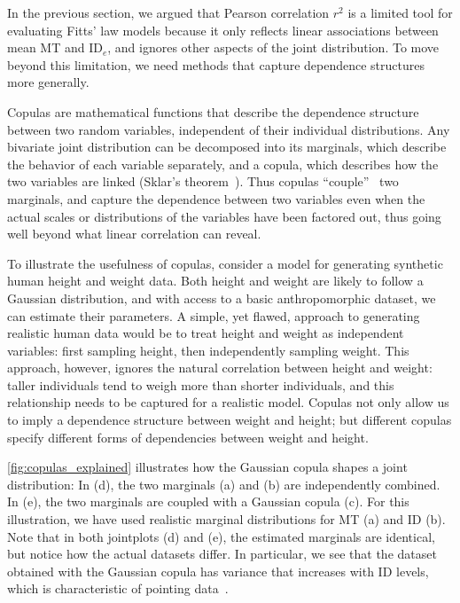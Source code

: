 \documentclass[acmlarge, manuscript,review]{acmart}
\begin{document}
In the previous section, we argued that Pearson correlation $r^2$ is a limited tool for evaluating Fitts' law models because it only reflects linear associations between mean MT and ID$_e$, and ignores other aspects of the joint distribution. To move beyond this limitation, we need methods that capture dependence structures more generally.

Copulas are mathematical functions that describe the dependence structure between two random variables, independent of their individual distributions. Any bivariate joint distribution can be decomposed into its marginals, which describe the behavior of each variable separately, and a copula, which describes how the two variables are linked (Sklar's theorem~\cite{nelsen2006}). Thus copulas ``couple''~\cite[Chapter 1]{nelsen2006} two marginals, and capture the dependence between two variables even when the actual scales or distributions of the variables have been factored out, thus going well beyond what linear correlation can reveal.

To illustrate the usefulness of copulas, consider a model for generating synthetic human height and weight data. Both height and weight are likely to follow a Gaussian distribution, and with access to a basic anthropomorphic dataset, we can estimate their parameters.
A simple, yet flawed, approach to generating realistic human data would be to treat height and weight as independent variables: first sampling height, then independently sampling weight. This approach, however, ignores the natural correlation between height and weight: taller individuals tend to weigh more than shorter individuals, and this relationship needs to be captured for a realistic model.
Copulas not only allow us to imply a dependence structure between weight and height; but different copulas specify different forms of dependencies between weight and height.

\autoref{fig:copulas_explained} illustrates how the Gaussian copula shapes a joint distribution: In (d), the two marginals (a) and (b) are independently combined. In (e), the two marginals are coupled with a Gaussian copula (c). For this illustration, we have used realistic marginal distributions for MT (a) and ID (b). Note that in both jointplots (d) and (e), the estimated marginals are identical, but notice how the actual datasets differ. In particular, we see that the dataset obtained with the Gaussian copula has variance that increases with ID levels, which is characteristic of pointing data~\cite{gori2018these}.
\end{document}
